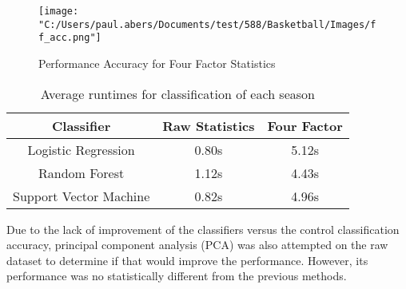 \documentclass[12pt]{article}%
\begin{document}
\begin{figure}[H]
\caption{Performance Accuracy for Four Factor Statistics}
\centering
\texttt{[image: "C:/Users/paul.abers/Documents/test/588/Basketball/Images/ff\_acc.png"]}
\end{figure}

\begin{table}[H]
\caption{Average runtimes for classification of each season}
\begin{center}
\begin{tabular}{ || c || c | c|| }
  \hline
  Classifier & Raw Statistics & Four Factor \\ [0.5 ex]
  \hline\hline
  Logistic Regression & 0.80s & 5.12s \\
  \hline
  Random Forest & 1.12s & 4.43s \\
  \hline
  Support Vector Machine & 0.82s & 4.96s \\
  \hline
\end{tabular}
\end{center}
\end{table}


Due to the lack of improvement of the classifiers versus the control classification accuracy, principal component analysis (PCA) was also attempted on the raw dataset to determine if that would improve the performance. However, its performance was no statistically different from the previous methods.
\end{document}
